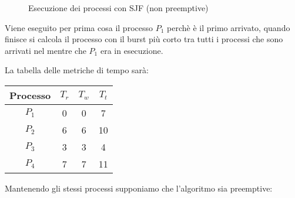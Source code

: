 \documentclass[a4paper]{article}
\begin{document}
\begin{example}
\begin{figure}[H]
    \caption{Esecuzione dei processi con SJF (non preemptive)}
  \end{figure}

  \noindent
  Viene eseguito per prima cosa il processo \( P_1 \) perchè è il primo arrivato,
  quando finisce si calcola il processo con il burst più corto tra tutti i processi
  che sono arrivati nel mentre che \( P_1 \) era in esecuzione.

  \vspace{1em}
  \noindent
  La tabella delle metriche di tempo sarà:
  \begin{table}[H]
    \centering
    \begin{tabular}{c|c|c|c}
      Processo & \( T_r \) & \( T_w \) & \( T_t \) \\
      \hline
      \( P_1 \) & 0 & 0 & 7 \\
      \( P_2 \) & 6 & 6 & 10 \\
      \( P_3 \) & 3 & 3 & 4 \\
      \( P_4 \) & 7 & 7 & 11 \\
    \end{tabular}
  \end{table}

  \vspace{1em}
  \noindent
  Mantenendo gli stessi processi supponiamo che l'algoritmo sia preemptive:

  \begin{figure}[H]
    \centering
\end{figure}
\end{example}
\end{document}
